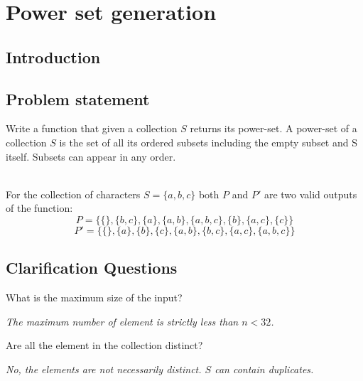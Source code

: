 %


\chapter{Power set generation}
\label{ch:power_set}
\section*{Introduction}


\section{Problem statement}
Write a function that given a collection $S$ returns its power-set. A power-set of a collection $S$ is the set of all its ordered subsets including the empty subset and S itself. Subsets can appear in any order.

\begin{example}
	\\ \hfill
	For the collection of characters $S=\{a,b,c\}$  both $P$ and $P'$ are two valid outputs of the function:
	\begin{equation*}
		P = \{\{\}, \{b,c\}, \{a\}, \{a,b\}, \{a,b,c\}, \{b\}, \{a,c\}, \{c\} \}
	\end{equation*}
	\begin{equation*}
		P' = \{\{\}, \{a\}, \{b\}, \{c\}, \{a,b\}, \{b,c\}, \{a,c\}, \{a,b,c\} \}
	\end{equation*}
	
\end{example}

\section{Clarification Questions}

\begin{QandA}
	\item What is the maximum size of the input?
	\begin{answered}
		\textit{The maximum number of element is strictly less than $n < 32$.}
	\end{answered}
	
	\item Are all the element in the collection distinct?
	\begin{answered}
		\textit{No, the elements are not necessarily distinct. $S$ can contain duplicates.
}
	\end{answered}
\end{QandA}

